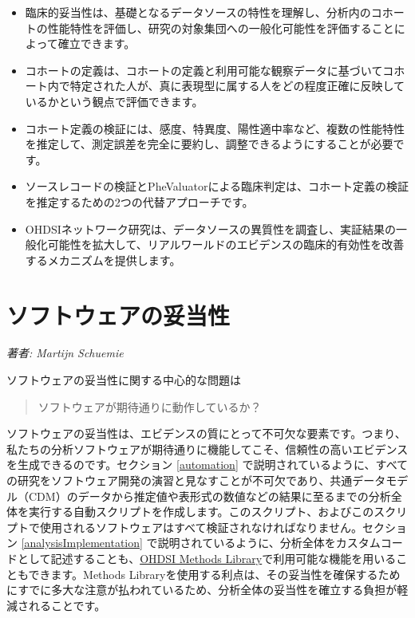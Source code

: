 \documentclass[
  11pt]{book}
\makeatletter
\providecommand{\tightlist}{%
  \setlength{\itemsep}{0pt}\setlength{\parskip}{0pt}}
\newenvironment{kframe}{%
\medskip{}
\setlength{\fboxsep}{.8em}
 \def\at@end@of@kframe{}%
 \ifinner\ifhmode%
  \def\at@end@of@kframe{\end{minipage}}%
  \begin{minipage}{\columnwidth}%
 \fi\fi%
 \def\FrameCommand##1{\hskip\@totalleftmargin \hskip-\fboxsep
 \colorbox{myShadeColor}{##1}\hskip-\fboxsep
     \hskip-\linewidth \hskip-\@totalleftmargin \hskip\columnwidth}%
 \MakeFramed {\advance\hsize-\width
   \@totalleftmargin\z@ \linewidth\hsize
   \@setminipage}}%
 {\par\unskip\endMakeFramed%
 \at@end@of@kframe}
\newenvironment{rmdblock}[1]
  {
  \begin{itemize}
  \renewcommand{\labelitemi}{
    \raisebox{-.7\height}[0pt][0pt]{
      {\setkeys{Gin}{width=3em,keepaspectratio}\texttt{[image: images/\#1]}}
    }
  }
  \setlength{\fboxsep}{1em}
  \begin{kframe}
  \item
  }
  {
  \end{kframe}
  \end{itemize}
  }
\newenvironment{rmdsummary}
  {\begin{rmdblock}{summary}}
  {\end{rmdblock}}
\theoremstyle{definition}
\theoremstyle{definition}
\theoremstyle{definition}
\theoremstyle{definition}
\theoremstyle{remark}
\makeatother
\begin{document}
\begin{rmdsummary}
\begin{itemize}
\tightlist
\item
  臨床的妥当性は、基礎となるデータソースの特性を理解し、分析内のコホートの性能特性を評価し、研究の対象集団への一般化可能性を評価することによって確立できます。
\item
  コホートの定義は、コホートの定義と利用可能な観察データに基づいてコホート内で特定された人が、真に表現型に属する人をどの程度正確に反映しているかという観点で評価できます。
\item
  コホート定義の検証には、感度、特異度、陽性適中率など、複数の性能特性を推定して、測定誤差を完全に要約し、調整できるようにすることが必要です。
\item
  ソースレコードの検証とPheValuatorによる臨床判定は、コホート定義の検証を推定するための2つの代替アプローチです。
\item
  OHDSIネットワーク研究は、データソースの異質性を調査し、実証結果の一般化可能性を拡大して、リアルワールドのエビデンスの臨床的有効性を改善するメカニズムを提供します。
\end{itemize}
\end{rmdsummary}

\chapter{ソフトウェアの妥当性}\label{SoftwareValidity}

\emph{著者: Martijn Schuemie}

ソフトウェアの妥当性に関する中心的な問題は

\begin{quote}
ソフトウェアが期待通りに動作しているか？
\end{quote}

ソフトウェアの妥当性は、エビデンスの質にとって不可欠な要素です。つまり、私たちの分析ソフトウェアが期待通りに機能してこそ、信頼性の高いエビデンスを生成できるのです。セクション \ref{automation} で説明されているように、すべての研究をソフトウェア開発の演習と見なすことが不可欠であり、共通データモデル（CDM）のデータから推定値や表形式の数値などの結果に至るまでの分析全体を実行する自動スクリプトを作成します。このスクリプト、およびこのスクリプトで使用されるソフトウェアはすべて検証されなければなりません。セクション \ref{analysisImplementation} で説明されているように、分析全体をカスタムコードとして記述することも、\href{https://ohdsi.github.io/MethodsLibrary/}{OHDSI Methods Library}で利用可能な機能を用いることもできます。Methods Libraryを使用する利点は、その妥当性を確保するためにすでに多大な注意が払われているため、分析全体の妥当性を確立する負担が軽減されることです。
\end{document}

